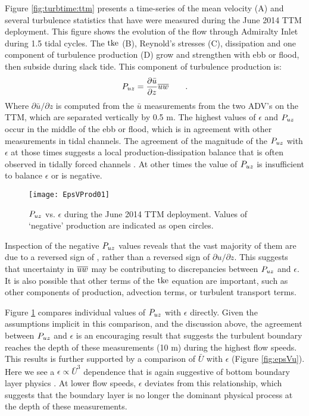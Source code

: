 Figure \ref{fig:turbtime:ttm} presents a time-series of the mean velocity (A) and several turbulence statistics that have were measured during the June 2014 TTM deployment. This figure shows the evolution of the flow through Admiralty Inlet during 1.5 tidal cycles. The $\mathrm{tke}$ (B), Reynold's stresses (C), dissipation and one component of turbulence production (D) grow and strengthen with ebb or flood, then subside during slack tide.  This component of turbulence production is:
\begin{align}
  P_{uz} = \frac{\partial \bar{u}}{\partial z}\overline{uw} \qquad .
\end{align}
Where $\partial \bar{u}/\partial z$ is computed from the $\bar{u}$ measurements from the two ADV's on the TTM, which are separated vertically by 0.5 m. The highest values of $\epsilon$ and $P_{uz}$ occur in the middle of the ebb or flood, which is in agreement with other measurements in tidal channels. The agreement of the magnitude of the $P_{uz}$ with $\epsilon$ at those times suggests a local production-dissipation balance that is often observed in tidally forced channels \citep[]{Trowbridge++1999,Stacey++1999,McMillan++2016}. At other times the value of $P_{uz}$ is insufficient to balance $\epsilon$ or is negative.

\begin{figure}[t]
  \centering
  \texttt{[image: EpsVProd01]}
  \caption{$P_{uz}$ vs. $\epsilon$ during the June 2014 TTM deployment. Values of `negative' production are indicated as open circles. }
  \label{fig:prodVeps}
\end{figure}

Inspection of the negative $P_{uz}$ values reveals that the vast majority of them are due to a reversed sign of \uw, rather than a reversed sign of $\partial u / \partial z$. This suggests that uncertainty in $\overline{uw}$ may be contributing to discrepancies between $P_{uz}$ and $\epsilon$. It is also possible that other terms of the $\mathrm{tke}$ equation are important, such as other components of production, advection terms, or turbulent transport terms.

Figure \ref{fig:prodVeps} compares individual values of $P_{uz}$ with $\epsilon$ directly. Given the assumptions implicit in this comparison, and the discussion above, the agreement between $P_{uz}$ and $\epsilon$ is an encouraging result that suggests the turbulent boundary reaches the depth of these measurements (10 m) during the highest flow speeds. This results is further supported by a comparison of $\bar{U}$ with $\epsilon$ (Figure \ref{fig:epsVu}). Here we see a $\epsilon \propto \bar{U}^3$ dependence that is again suggestive of bottom boundary layer physics \cite{Trowbridge1992,Nash++2009}. At lower flow speeds, $\epsilon$ deviates from this relationship, which suggests that the boundary layer is no longer the dominant physical process at the depth of these measurements.


